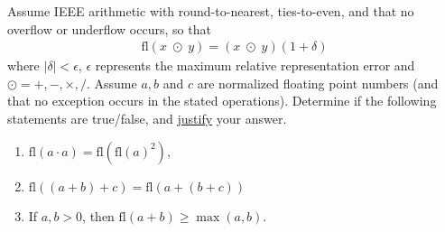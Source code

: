\documentclass{ximera}
\begin{document}
\begin{exercise}
    Assume IEEE arithmetic with round-to-nearest, ties-to-even, and that no overflow or underflow occurs, so that
\begin{align*}
    \text{fl}(x \; \odot\; y) = (x \; \odot\; y)(1+\delta)
\end{align*}
where $|\delta| < \epsilon$, $\epsilon$ represents the maximum relative representation error and $\odot = +, - , \times, /$.  Assume $a, b$ and $c$ are normalized floating point numbers (and that no exception occurs in the stated operations). Determine if the following statements are true/false, and \underline{justify} your answer.
    \begin{enumerate}
        \item $\text{fl}(a \cdot a) = \text{fl}({\text{fl}(a)^2})$, 
        \vfill
        \item $\text{fl}((a+b)+c) = \text{fl}(a+(b+c))$
        \vfill
        \item If $a,b>0$, then $\text{fl}(a+b)\geq \max(a,b)$.
        \vfill
    \end{enumerate}
\end{exercise}
\newpage












\end{document}
